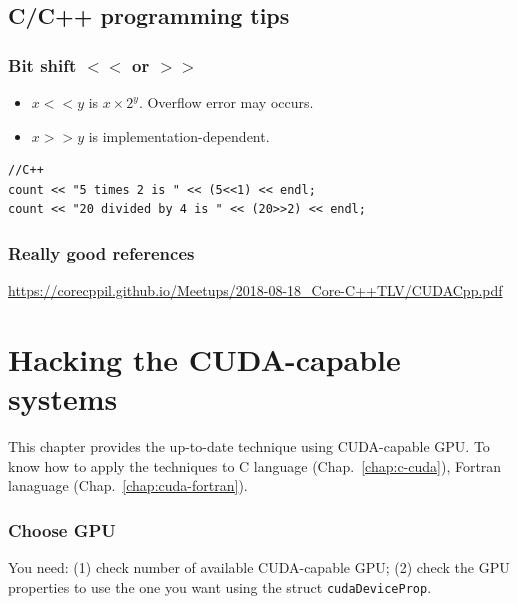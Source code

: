 \section{C/C++ programming tips}
\label{sec:cc++-progr-tips}

\subsection{Bit shift $<<$ or $>>$}
\label{sec:bit-shift-}

\begin{itemize}
\item $x << y$ is $x\times 2^y$. Overflow error may occurs.

\item $x >> y$ is implementation-dependent.
\end{itemize}

\begin{lstlisting}
//C++
count << "5 times 2 is " << (5<<1) << endl;
count << "20 divided by 4 is " << (20>>2) << endl;
\end{lstlisting}


\subsection{Really good references}

\url{https://corecppil.github.io/Meetups/2018-08-18_Core-C++TLV/CUDACpp.pdf}

\chapter{Hacking the CUDA-capable systems}
\label{sec:hacking-systems}

This chapter provides the up-to-date technique using CUDA-capable GPU. To know
how to apply the techniques to C language (Chap.~\ref{chap:c-cuda}), Fortran
lanaguage (Chap.~\ref{chap:cuda-fortran}).


  



\subsection{Choose GPU}
\label{sec:cudac_choose_gpu}

You need: (1) check number of available CUDA-capable GPU; (2) check the GPU
properties to use the one you want using the struct \verb!cudaDeviceProp!.

